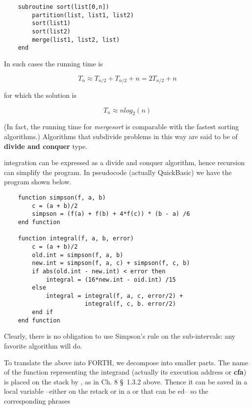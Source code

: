 \begin{verbatim}
    subroutine sort(list[0,n])
        partition(list, list1, list2)
        sort(list1)
        sort(list2)
        merge(list1, list2, list)
    end
\end{verbatim}

In such cases the running time is

\begin{equation}
T_{n} \approx T_{n/2} + T_{n/2} + n = 2T_{n/2} + n
\end{equation}

for which the solution is

\begin{equation}
T_{n} \approx n log_2 (n)
\end{equation}

(In fact, the running time for \textit{mergesort} is comparable with the fastest sorting algorithms.) Algorithms that subdivide problems in this way are said to be of \textbf{divide and conquer} type.

 integration can be expressed as a divide and conquer algorithm, hence recursion can simplify the program. In pseudocode (actually QuickBasic\textsuperscript{\textregistered}) we have the program shown
below.

\begin{verbatim}
    function simpson(f, a, b)
        c = (a + b)/2
        simpson = (f(a) + f(b) + 4*f(c)) * (b - a) /6
    end function

    function integral(f, a, b, error)
        c = (a + b)/2
        old.int = simpson(f, a, b)
        new.int = simpson(f, a, c) + simpson(f, c, b)
        if abs(old.int - new.int) < error then
            integral = (16*new.int - oid.int) /15
        else
            integral = integral(f, a, c, error/2) +
                       integral(f, c, b. error/2)
        end if
    end function
\end{verbatim}

Clearly, there is no obligation to use Simpson's rule on the sub-intervals: any favorite algorithm will do.

To translate the above into FORTH, we decompose into smaller parts. The name of the function representing the integrand (actually its execution address or \textbf{cfa}) is placed on the stack by , as in Ch. 8 \S\ 1.3.2 above. Thence it can be saved in a local variable --either on the rstack or in a  or  that can be ed-- so the corresponding phrases

